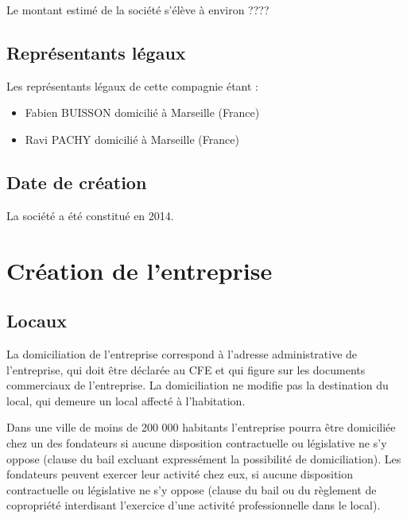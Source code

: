 \documentclass[11pt]{article}
\begin{document}
Le montant estimé de la société s'élève à environ ????%
\subsection{Représentants légaux}
\label{sub:representants}

Les représentants légaux de cette compagnie étant :
\begin{itemize}
	\item Fabien BUISSON domicilié à Marseille (France)
	\item Ravi PACHY domicilié à Marseille (France)
\end{itemize}


\subsection{Date de création}
\label{sub:date_creation}
La société a été constitué en 2014.




\section{Création de l'entreprise}
\label{sec:creation_entreprise}

\subsection{Locaux}
\label{sub:locaux}

La domiciliation de l'entreprise correspond à l'adresse administrative de l'entreprise, qui doit être déclarée au CFE et qui figure sur les documents commerciaux de l'entreprise. La domiciliation ne modifie pas la destination du local, qui demeure un local affecté à l'habitation.

Dans une ville de moins de 200 000 habitants l'entreprise pourra être domiciliée chez un des fondateurs si aucune disposition contractuelle ou législative ne s'y oppose (clause du bail excluant expressément la possibilité de domiciliation). Les fondateurs peuvent exercer leur activité chez eux, si aucune disposition contractuelle ou législative ne s'y oppose (clause du bail ou du règlement de copropriété interdisant l'exercice d'une activité professionnelle dans le local).
\end{document}
